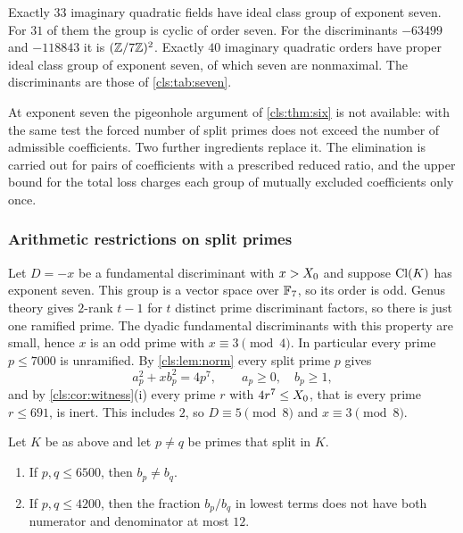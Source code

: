 \begin{theorem}\label{cls:thm:seven}
Exactly $33$ imaginary quadratic fields have ideal class group of exponent seven. For
$31$ of them the group is cyclic of order seven. For the discriminants $-63499$ and
$-118843$ it is $(\mathbb{Z}/7\mathbb{Z})^2$. Exactly $40$ imaginary quadratic orders have proper ideal
class group of exponent seven, of which seven are nonmaximal. The discriminants are those
of \cref{cls:tab:seven}.
\end{theorem}

At exponent seven the pigeonhole argument of \cref{cls:thm:six} is not available: with
the same test the forced number of split primes does not exceed the number of admissible
coefficients. Two further ingredients replace it. The elimination is carried out for
pairs of coefficients with a prescribed reduced ratio, and the upper bound for the total
loss charges each group of mutually excluded coefficients only once.

\subsubsection*{Arithmetic restrictions on split primes}
Let $D=-x$ be a fundamental discriminant with $x>X_0$ and suppose $\operatorname{Cl}(K)$ has
exponent seven. This group is a vector space over $\mathbb{F}_7$, so its order is odd. Genus theory
gives $2$-rank $t-1$ for $t$ distinct prime discriminant factors, so there is just one
ramified prime. The dyadic fundamental discriminants with this property are small, hence
$x$ is an odd prime with $x\equiv3\pmod4$. In particular every prime $p\le7000$ is
unramified. By \cref{cls:lem:norm} every split prime $p$ gives
\begin{equation}\label{cls:eq:norm7}
 a_p^2+xb_p^2=4p^7,\qquad a_p\ge0,\quad b_p\ge1 ,
\end{equation}
and by \cref{cls:cor:witness}(i) every prime $r$ with $4r^7\le X_0$, that is every
prime $r\le691$, is inert. This includes $2$, so $D\equiv5\pmod8$ and $x\equiv3\pmod8$.

\begin{lemma}\label{cls:lem:sevenpairs}
Let $K$ be as above and let $p\ne q$ be primes that split in $K$.
\begin{enumerate}[label=\textup{(\roman*)}]
\item If $p,q\le6500$, then $b_p\ne b_q$.
\item If $p,q\le4200$, then the fraction $b_p/b_q$ in lowest terms does not have both
numerator and denominator at most $12$.
\end{enumerate}
\end{lemma}

